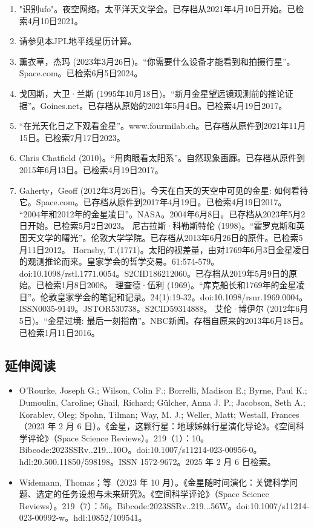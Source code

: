 \begin{enumerate}
\item "识别ufo"。夜空网络。太平洋天文学会。已存档从2021年4月10日开始。已检索4月10日2021。
\item 请参见本JPL地平线星历计算。
\item 薰衣草，杰玛 (2023年3月26日)。“你需要什么设备才能看到和拍摄行星”。Space.com。已检索6月5日2024。
\item 戈因斯，大卫·兰斯 (1995年10月18日)。“新月金星望远镜观测前的推论证据”。Goines.net。已存档从原始的2021年5月4日。已检索4月19日2017。
\item “在光天化日之下观看金星”。www.fourmilab.ch。已存档从原件到2021年11月15日。已检索7月17日2023。
\item Chris Chatfield (2010)。“用肉眼看太阳系”。自然现象画廊。已存档从原件到2015年6月13日。已检索4月19日2017。
\item Gaherty，Geoff (2012年3月26日)。今天在白天的天空中可见的金星: 如何看待它。Space.com。已存档从原件到2017年4月19日。已检索4月19日2017。
 “2004年和2012年的金星凌日”。NASA。2004年6月8日。已存档从2023年5月2日开始。已检索5月2日2023。
 尼古拉斯·科勒斯特伦 (1998)。“霍罗克斯和英国天文学的曙光”。伦敦大学学院。已存档从2013年6月26日的原件。已检索5月11日2012。
 Hornsby, T.(1771)。太阳的视差量，由对1769年6月3日金星凌日的观测推论而来。皇家学会的哲学交易。61:574-579。doi:10.1098/rstl.1771.0054。S2CID186212060。已存档从2019年5月9日的原始。已检索1月8日2008。 
 理查德·伍利 (1969)。“库克船长和1769年的金星凌日”。伦敦皇家学会的笔记和记录。24(1):19-32。doi:10.1098/rsnr.1969.0004。ISSN0035-9149。JSTOR530738。S2CID59314888。   
 艾伦·博伊尔 (2012年6月5日)。“金星过境: 最后一刻指南”。NBC新闻。存档自原来的2013年6月18日。已检索1月11日2016。
\end{enumerate}
\subsection{延伸阅读}
\begin{itemize}
\item O'Rourke, Joseph G.; Wilson, Colin F.; Borrelli, Madison E.; Byrne, Paul K.; Dumoulin, Caroline; Ghail, Richard; Gülcher, Anna J. P.; Jacobson, Seth A.; Korablev, Oleg; Spohn, Tilman; Way, M. J.; Weller, Matt; Westall, Frances（2023 年 2 月 6 日）。《金星，这颗行星：地球姊妹行星演化导论》。《空间科学评论》（Space Science Reviews）。219（1）：10。Bibcode:2023SSRv..219...10O。doi:10.1007/s11214-023-00956-0。hdl:20.500.11850/598198。ISSN 1572-9672。2025 年 2 月 6 日检索。
\item Widemann, Thomas；等（2023 年 10 月）。《金星随时间演化：关键科学问题、选定的任务设想与未来研究》。《空间科学评论》（Space Science Reviews）。219（7）：56。Bibcode:2023SSRv..219...56W。doi:10.1007/s11214-023-00992-w。hdl:10852/109541。
\end{itemize}

